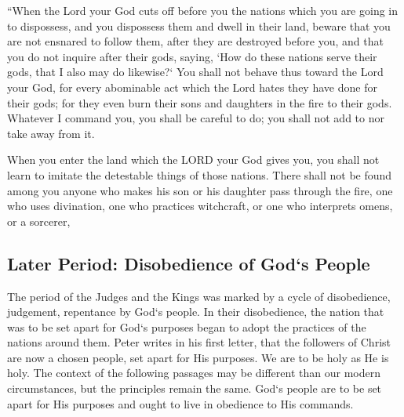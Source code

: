 

\vspace{1\baselineskip}

\begin{scripture}[Deuteronomy 12:29-32]
    “When the Lord your God cuts off before you the nations which you are going in to dispossess, and you dispossess them and dwell in their land,
    beware that you are not ensnared to follow them, after they are destroyed before you,     
    and that you do not inquire after their gods, saying, `How do these nations serve their gods, that I also may do likewise?`
    You shall not behave thus toward the Lord your God, for every abominable act which the Lord hates they have done for their gods; for they even burn their sons and daughters in the fire to their gods.
    Whatever I command you, you shall be careful to do; you shall not add to nor take away from it. 
\end{scripture}


\vspace{1\baselineskip}


\begin{scripture}[Deuteronomy 18:9-10]
    When you enter the land which the LORD your God gives you, you shall not learn to imitate the detestable things of those nations.
    There shall not be found among you anyone who makes his son or his daughter pass through the fire, one who uses divination, one who practices witchcraft, or one who interprets omens, or a sorcerer,
\end{scripture}
















\pagebreak
\subsection{Later Period: Disobedience of God`s People}
\begin{fullwidth}
The period of the Judges and the Kings was marked by a cycle of disobedience, judgement, repentance by God`s people. In their disobedience, the nation that was to be set apart for God`s purposes
began to adopt the practices of the nations around them. Peter writes in his first letter, that the followers of Christ are now a chosen people, set apart for His purposes. We are to be holy as He is holy.
The context of the following passages may be different than our modern circumstances, but the principles remain the same. God`s people are to be set apart for His purposes and ought to live in obedience to His commands.
\end{fullwidth}

